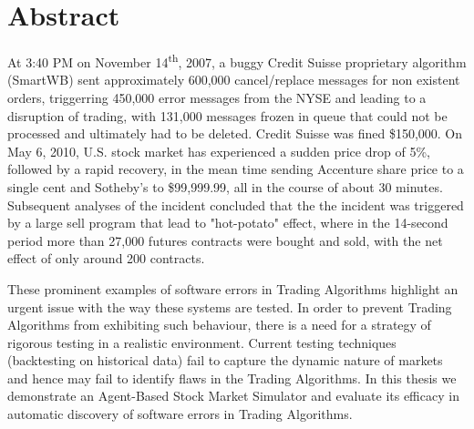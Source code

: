 \chapter*{Abstract}
At 3:40 PM on November 14\textsuperscript{th}, 2007, a buggy Credit Suisse proprietary algorithm (SmartWB) sent approximately 600,000 cancel/replace messages for non existent orders, triggerring 450,000 error messages from the NYSE and leading to a disruption of trading, with 131,000 messages frozen in queue that could not be processed and ultimately had to be deleted. Credit Suisse was fined \$150,000.\cite{Nyse2009} On May 6, 2010, U.S. stock market has experienced a sudden price drop of 5\%, followed by a rapid recovery, in the mean time sending Accenture share price to a single cent and Sotheby’s to \$99,999.99, all in the course of about 30 minutes. Subsequent analyses of the incident concluded that the the incident was triggered by a large sell program that lead to "hot-potato" effect, where in the 14-second period more than 27,000 futures contracts were bought and sold, with the net effect of only around 200 contracts. \cite{Kirilenko2011}

These prominent examples of software errors in Trading Algorithms highlight an urgent issue with the way these systems are tested. In order to prevent Trading Algorithms from exhibiting such behaviour, there is a need for a strategy of rigorous testing in a realistic environment. Current testing techniques (backtesting on historical data) fail to capture the dynamic nature of markets and hence may fail to identify flaws in the Trading Algorithms. In this thesis we demonstrate an Agent-Based Stock Market Simulator and evaluate its efficacy in automatic discovery of software errors in Trading Algorithms.
\vfill